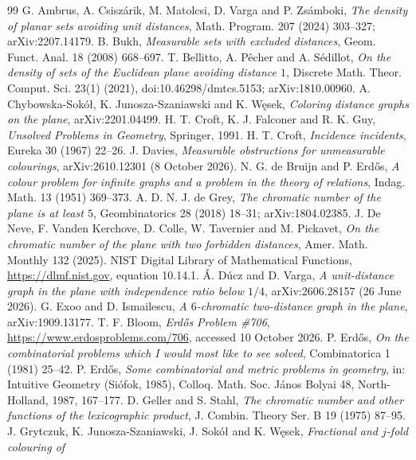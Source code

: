 \documentclass[11pt,a4paper]{amsart}
\theoremstyle{definition}
\theoremstyle{remark}
\begin{document}
\begin{thebibliography}{99}
 G. Ambrus, A. Csiszárik, M. Matolcsi, D. Varga and P. Zsámboki, \emph{The density of planar sets
avoiding unit distances}, Math. Program. 207 (2024) 303--327; arXiv:2207.14179.
 B. Bukh, \emph{Measurable sets with excluded distances}, Geom. Funct. Anal. 18 (2008) 668--697.
 T. Bellitto, A. P\^echer and A. S\'edillot, \emph{On the density of sets of the Euclidean plane avoiding
distance $1$}, Discrete Math. Theor. Comput. Sci. 23(1) (2021), doi:10.46298/dmtcs.5153; arXiv:1810.00960.
 A. Chybowska-Sokół, K. Junosza-Szaniawski and K. Węsek, \emph{Coloring distance graphs on the plane},
arXiv:2201.04499.
 H. T. Croft, K. J. Falconer and R. K. Guy, \emph{Unsolved Problems in Geometry}, Springer, 1991.
 H. T. Croft, \emph{Incidence incidents}, Eureka 30 (1967) 22--26.
 J. Davies, \emph{Measurable obstructions for unmeasurable colourings}, arXiv:2610.12301 (8 October
2026).
 N. G. de Bruijn and P. Erd\H{o}s, \emph{A colour problem for infinite graphs and a problem in the theory
of relations}, Indag. Math. 13 (1951) 369--373.
 A. D. N. J. de Grey, \emph{The chromatic number of the plane is at least $5$}, Geombinatorics 28
(2018) 18--31; arXiv:1804.02385.
 J. De Neve, F. Vanden Kerchove, D. Colle, W. Tavernier and M. Pickavet, \emph{On the chromatic
number of the plane with two forbidden distances}, Amer. Math. Monthly 132 (2025).
 NIST Digital Library of Mathematical Functions, \url{https://dlmf.nist.gov}, equation 10.14.1.
 Á. Dúcz and D. Varga, \emph{A unit-distance graph in the plane with independence ratio below $1/4$},
arXiv:2606.28157 (26 June 2026).
 G. Exoo and D. Ismailescu, \emph{A $6$-chromatic two-distance graph in the plane}, arXiv:1909.13177.
 T. F. Bloom, \emph{Erd\H{o}s Problem \#706}, \url{https://www.erdosproblems.com/706}, accessed 10
October 2026.
 P. Erd\H{o}s, \emph{On the combinatorial problems which I would most like to see solved},
Combinatorica 1 (1981) 25--42.
 P. Erd\H{o}s, \emph{Some combinatorial and metric problems in geometry}, in: Intuitive Geometry
(Si\'ofok, 1985), Colloq. Math. Soc. J\'anos Bolyai 48, North-Holland, 1987, 167--177.
 D. Geller and S. Stahl, \emph{The chromatic number and other functions of the lexicographic product},
J. Combin. Theory Ser. B 19 (1975) 87--95.
 J. Grytczuk, K. Junosza-Szaniawski, J. Sokół and K. Węsek, \emph{Fractional and $j$-fold colouring of
}
\end{thebibliography}
\end{document}
